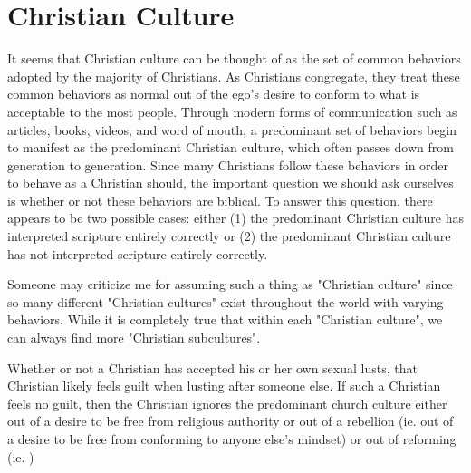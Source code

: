 \documentclass[a4paper, 12pt]{article}
\begin{document}
\section*{Christian Culture}
It seems that Christian culture can be thought of as the set of common behaviors adopted by the majority of Christians. As Christians congregate, they treat these common behaviors as normal out of the ego's desire to conform to what is acceptable to the most people. Through modern forms of communication such as articles, books, videos, and word of mouth, a predominant set of behaviors begin to manifest as the predominant Christian culture, which often passes down from generation to generation. Since many Christians follow these behaviors in order to behave as a Christian should, the important question we should ask ourselves is whether or not these behaviors are biblical. To answer this question, there appears to be two possible cases: either (1) the predominant Christian culture has interpreted scripture entirely correctly or (2) the predominant Christian culture has not interpreted scripture entirely correctly.

Someone may criticize me for assuming such a thing as "Christian culture" since so many different "Christian cultures" exist throughout the world with varying behaviors. While it is completely true that within each "Christian culture", we can always find more "Christian subcultures".


Whether or not a Christian has accepted his or her own sexual lusts, that Christian likely feels guilt when lusting after someone else. If such a Christian feels no guilt, then the Christian ignores the predominant church culture either out of a desire to be free from religious authority or out of a
rebellion (ie. out of a desire to be free from conforming to anyone else's mindset) or out of reforming (ie. )
\end{document}

